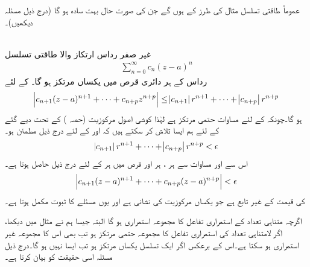 عموماً طاقتی تسلسل مثال  کی طرز کے ہوں گے جن کی صورت حال بہت سادہ ہو گا (درج ذیل مسئلہ دیکھیں)۔  

\quad {}\\
غیر صفر رداس ارتکاز  والا طاقتی تسلسل
\begin{align}\label{مساوات_ٹیلر_یکساں_مرکوزیت_ثبوت_الف}
\sum\limits_{n=0}^{\infty} c_n(z-a)^n
\end{align}
رداس  کے ہر دائری قرص  میں یکساں مرتکز ہو گا۔ 
\quad
{} کے لئے
\begin{align}\label{مساوات_ٹیلر_یکساں_مرکوزیت_ثبوت_ب}
\abs{c_{n+1}(z-a)^{n+1}+\cdots+c_{n+p}z^{n+p}}\le \abs{c_{n+1}}r^{n+1}+\cdots+\abs{c_{n+p}}r^{n+p}
\end{align}
ہو گا۔چونکہ   کے لئے مساوات  حتمی مرتکز ہے لہٰذا کوشی اصول مرکوزیت (حصہ ) کے تحت دیے گئے  کے لئے ہم ایسا  تلاش کر سکتے ہیں کہ  اور  کے لئے  درج ذیل مطمئن ہو۔
\begin{align*}
\abs{c_{n+1}}r^{n+1}+\cdots+\abs{c_{n+p}}r^{n+p}<\epsilon
\end{align*}
اس سے اور مساوات  سے ہر ، ہر  اور قرص  میں ہر  کے لئے درج ذیل حاصل ہوتا ہے۔
\begin{align*}
\abs{c_{n+1}(z-a)^{n+1}+\cdots+c_{n+p}(z-a)^{n+p}}<\epsilon
\end{align*}
 کی قیمت  کے غیر تابع ہے جو یکساں مرکوزیت کی نشانی ہے اور یوں مسئلے کا ثبوت مکمل ہوتا ہے۔

اگرچہ متناہی تعداد کے استمراری تفاعل کا مجموعہ استمراری ہو گا البتہ جیسا ہم نے مثال  میں دیکھا، اگر لامتناہی تعداد کی استمراری تفاعل کا مجموعہ حتمی مرتکز ہو تب بھی اس کا مجموعہ  غیر استمراری ہو سکتا ہے۔اس کے برعکس اگر ایک تسلسل یکساں مرتکز ہو تب ایسا نہیں ہو گا۔درج ذیل مسئلہ اسی حقیقت کو بیان کرتا ہے۔

